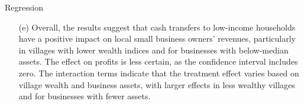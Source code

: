 \begin{homeworkProblem}{Regression}
\begin{solution}
\begin{itemize}
                The regression equation for column (4) is:
                \[
                    Y_{ivd} = \alpha_0 + \alpha_1 \text{Treatment}_{v} + 
                    \alpha_2 \text{Above median business assets}_{iv} +
                    \alpha_3 \left( \text{Treatment}_{v} \times 
                    \text{Above-median}_{iv} \right) + 
                    \varepsilon_{ivd}.
                \]
                $\alpha_1 = 240.4$ represents the treatment effect on
                monthly revenues for business owners with below-median
                business assets. $\alpha_2 = 110.5$ indicates that for businesses 
                with above-median business assets, monthly revenues increase by 
                110.5 on average, holding treatment status constant. $\alpha_3 
                = -68.3$ suggests that the treatment effect decreases by 68.3 
                for businesses with above-median business assets for each 
                level of treatment. This suggests that the treatment effect is
                larger for businesses with below-median assets and smaller for
                businesses with above-median assets.

                \item[(e)] Overall, the results suggest that cash transfers to low-income
                households have a positive impact on local small business owners'
                revenues, particularly in villages with lower wealth indices and
                for businesses with below-median assets. The effect on profits is
                less certain, as the confidence interval includes zero. The
                interaction terms indicate that the treatment effect varies based
                on village wealth and business assets, with larger effects in
                less wealthy villages and for businesses with fewer assets.
        \end{itemize}

    \end{solution}

\end{homeworkProblem}